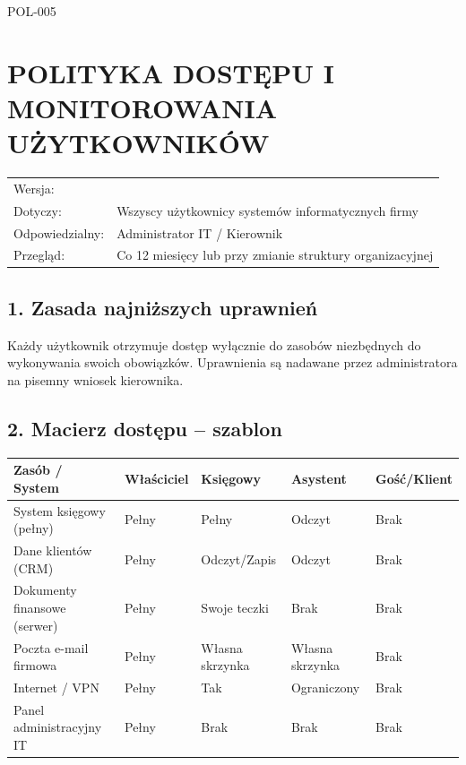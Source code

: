 \documentclass[12pt,a4paper]{article}
\begin{document}
\label{doc5}
POL-005

\section{POLITYKA DOSTĘPU I MONITOROWANIA
UŻYTKOWNIKÓW}\label{polityka-dostux119pu-i-monitorowania-uux17cytkownikuxf3w}

\begin{longtable}[]{@{}>{\raggedright\arraybackslash}p{}>{\raggedright\arraybackslash}p{}@{}}
\toprule\noalign{}
\endhead
\bottomrule\noalign{}
\endlastfoot
Wersja: & 1.0 \\
Dotyczy: & Wszyscy użytkownicy systemów informatycznych firmy \\
Odpowiedzialny: & Administrator IT / Kierownik \\
Przegląd: & Co 12 miesięcy lub przy zmianie struktury organizacyjnej \\
\end{longtable}

\subsection{1. Zasada najniższych
uprawnień}\label{zasada-najniux17cszych-uprawnieux144}

Każdy użytkownik otrzymuje dostęp wyłącznie do zasobów niezbędnych do
wykonywania swoich obowiązków. Uprawnienia są nadawane przez
administratora na pisemny wniosek kierownika.

\subsection{2. Macierz dostępu --
szablon}\label{macierz-dostux119pu-szablon}

\begin{longtable}[]{@{}>{\raggedright\arraybackslash}p{}>{\raggedright\arraybackslash}p{}>{\raggedright\arraybackslash}p{}>{\raggedright\arraybackslash}p{}>{\raggedright\arraybackslash}p{}@{}}
\toprule\noalign{}
Zasób / System & Właściciel & Księgowy & Asystent & Gość/Klient \\
\midrule\noalign{}
\endhead
\bottomrule\noalign{}
\endlastfoot
System księgowy (pełny) & Pełny & Pełny & Odczyt & Brak \\
Dane klientów (CRM) & Pełny & Odczyt/Zapis & Odczyt & Brak \\
Dokumenty finansowe (serwer) & Pełny & Swoje teczki & Brak & Brak \\
Poczta e-mail firmowa & Pełny & Własna skrzynka & Własna skrzynka &
Brak \\
Internet / VPN & Pełny & Tak & Ograniczony & Brak \\
Panel administracyjny IT & Pełny & Brak & Brak & Brak \\
\end{longtable}
\end{document}
